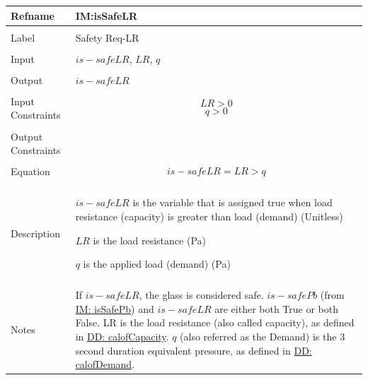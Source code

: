\documentclass[12pt]{article}
\begin{document}
\noindent \begin{minipage}{\textwidth}
          \begin{tabular}{>{\raggedright}p{}>{\raggedright\arraybackslash}p{}}
          \toprule \textbf{Refname} & \textbf{IM:isSafeLR}
          \label{IM:isSafeLR}
          \\ \midrule \\
          Label & Safety Req-LR
          \\ \midrule \\
          Input & $is-safeLR$, $LR$, $q$
          \\ \midrule \\
          Output & $is-safeLR$
          \\ \midrule \\
          Input Constraints & \begin{displaymath}
                              LR>0
                              \end{displaymath}
                              \begin{displaymath}
                              q>0
                              \end{displaymath}
          \\ \midrule \\
          Output Constraints & 
          \\ \midrule \\
          Equation & \begin{displaymath}
                     is-safeLR=LR>q
                     \end{displaymath}
          \\ \midrule \\
          Description & \begin{symbDescription}
                        \item{$is-safeLR$ is the variable that is assigned true when load resistance (capacity) is greater than load (demand) (Unitless)}
                        \item{$LR$ is the load resistance (Pa)}
                        \item{$q$ is the applied load (demand) (Pa)}
                        \end{symbDescription}
          \\ \midrule \\
          Notes & If $is-safeLR$, the glass is considered safe. $is-safePb$ (from \hyperref[IM:isSafePb]{IM: isSafePb}) and $is-safeLR$ are either both True or both False. LR is the load resistance (also called capacity), as defined in \hyperref[DD:calofCapacity]{DD: calofCapacity}. $q$ (also referred as the Demand) is the 3 second duration equivalent pressure, as defined in \hyperref[DD:calofDemand]{DD: calofDemand}.

\end{tabular}
\end{minipage}
\end{document}
